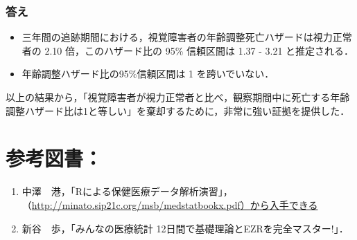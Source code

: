 \documentclass[]{problemset}
\providecommand{\tightlist}{%
  \setlength{\itemsep}{0pt}\setlength{\parskip}{0pt}}
\begin{document}
\hypertarget{-9}{%
\subsubsection{答え}\label{-9}}

\begin{itemize}
\item
  三年間の追跡期間における，視覚障害者の年齢調整死亡ハザードは視力正常者の
  2.10 倍，このハザード比の 95\% 信頼区間は 1.37 - 3.21 と推定される．
\item
  年齢調整ハザード比の95\%信頼区間は 1 を跨いでいない．
\end{itemize}

以上の結果から，「視覚障害者が視力正常者と比べ，観察期間中に死亡する年齢調整ハザード比は1と等しい」を棄却するために，非常に強い証拠を提供した．

\section{参考図書：}

\begin{enumerate}
\def\labelenumi{\arabic{enumi}.}
\tightlist
\item
  中澤　港，「Rによる保健医療データ解析演習」，\newline（\url{http://minato.sip21c.org/msb/medstatbookx.pdf）から入手できる}
\item
  新谷　歩，「みんなの医療統計 12日間で基礎理論とEZRを完全マスター!」．
\end{enumerate}
\end{document}

